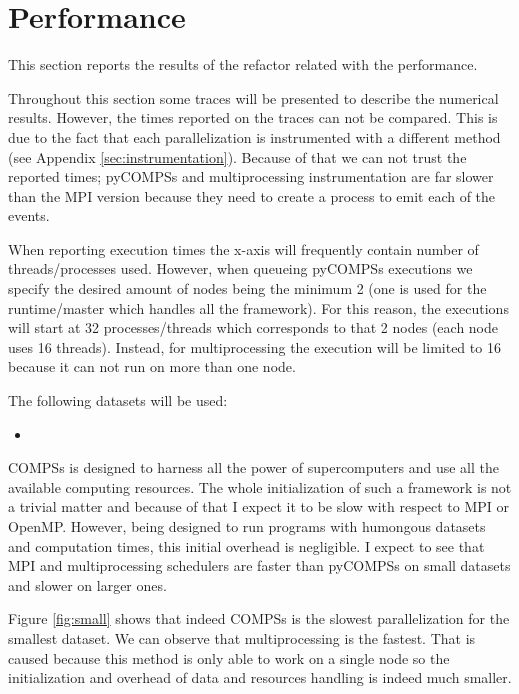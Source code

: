 \section{Performance}

\label{sec:resperformance}

This section reports the results of the refactor related with the performance. 

Throughout this section some traces will be presented to describe the numerical results. However, the times reported on the traces can not be compared. This is due to the fact that each parallelization is instrumented with a different method (see Appendix \ref{sec:instrumentation}). Because of that we can not trust the reported times; pyCOMPSs and multiprocessing instrumentation are far slower than the MPI version because they need to create a process to emit each of the events.

When reporting execution times the x-axis will frequently contain number of threads/processes used. However, when queueing pyCOMPSs executions we specify the desired amount of nodes being the minimum 2 (one is used for the runtime/master which handles all the framework). For this reason, the executions will start at 32 processes/threads which corresponds to that 2 nodes (each node uses 16 threads). Instead, for multiprocessing the execution will be limited to 16 because it can not run on more than one node.


The following datasets will be used:

\begin{itemize}
\item
\end{itemize}

COMPSs is designed to harness all the power of supercomputers and use all the available computing resources. The whole initialization of such a framework is not a trivial matter and because of that I expect it to be slow with respect to MPI or OpenMP. However, being designed to run programs with humongous datasets and computation times, this initial overhead is negligible. I expect to see that MPI and multiprocessing schedulers are faster than pyCOMPSs on small datasets and slower on larger ones. 

Figure \ref{fig:small} shows that indeed COMPSs is the slowest parallelization for the smallest dataset. We can observe that multiprocessing is the fastest. That is caused because this method is only able to work on a single node so the initialization and overhead of data and resources handling is indeed much smaller.

